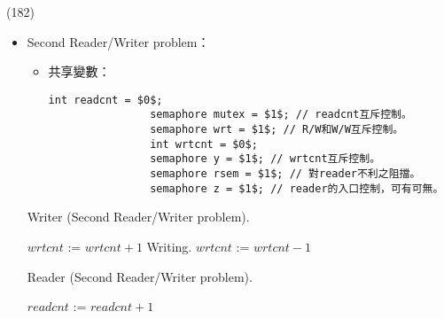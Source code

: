\begin{theorem}{(182)}
\begin{itemize}
\begin{algorithm}[H]
        \end{algorithm}
        \item Second Reader/Writer problem：\begin{itemize}
            \item 共享變數：\begin{lstlisting}[caption={Shared variables of Second Reader/Writer problem.}, captionpos=b, mathescape=true]
                int readcnt = $0$;
                semaphore mutex = $1$; // readcnt互斥控制。
                semaphore wrt = $1$; // R/W和W/W互斥控制。
                int wrtcnt = $0$;
                semaphore y = $1$; // wrtcnt互斥控制。
                semaphore rsem = $1$; // 對reader不利之阻擋。
                semaphore z = $1$; // reader的入口控制，可有可無。
            \end{lstlisting}
        \end{itemize}
        \begin{algorithm}[H]
            \caption{Writer (Second Reader/Writer problem).}
            \begin{algorithmic}[1]
                    \Repeat
                        \State {} 
                        \State $wrtcnt$ := $wrtcnt + 1$
                         
                            \State {}
                        \EndIf
                        \State {}
                        \State {}
                        \State Writing.
                        \State {}
                        \State $wrtcnt$ := $wrtcnt - 1$
                            \State {} 
                        \EndIf
                        \State {}
                        \State {}
                \EndFunction
            \end{algorithmic}
        \end{algorithm}
        \begin{algorithm}[H]
            \caption{Reader (Second Reader/Writer problem).}
            \begin{algorithmic}[1]
                    \Repeat
                        \State {} 
                        \State {} 
                        \State {}
                        \State $readcnt$ := $readcnt + 1$

\end{algorithmic}
\end{algorithm}
\end{itemize}
\end{theorem}
